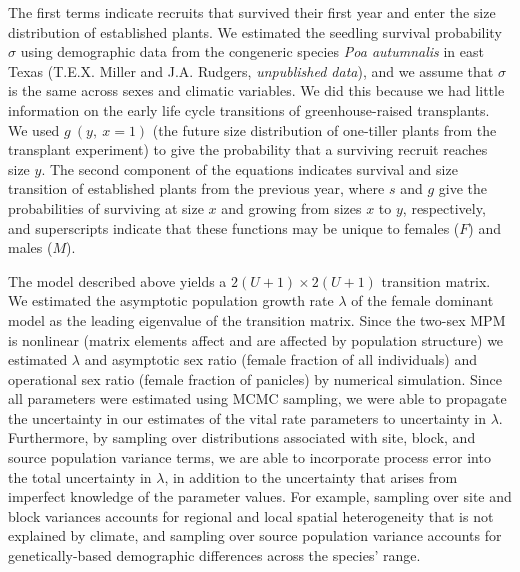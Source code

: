 \documentclass[9pt,twocolumn,twoside,lineno]{pnas-new}
\newcommand{\revise}[1]{{\color{Mahogany}{#1}}}
\begin{document}
\noindent The first terms indicate recruits that survived their first year and enter the size distribution of established plants.
We estimated the seedling survival probability $\sigma$ using demographic data from the congeneric species \textit{Poa autumnalis} in east Texas (T.E.X. Miller and J.A. Rudgers, \textit{unpublished data}), and we assume that $\sigma$ is the same across sexes and climatic variables. 
We did this because we had little information on the early life cycle transitions of greenhouse-raised transplants.
We used $g\ (y,\ x=1)$ (the future size distribution of one-tiller plants from the transplant experiment) to give the probability that a surviving recruit reaches size $y$.
The second component of the equations indicates survival and size transition of established plants from the previous year, where $s$ and $g$ give the probabilities of surviving at size $x$ and growing from sizes $x$ to $y$, respectively, and superscripts indicate that these functions may be unique to females ($F$) and males ($M$).

The model described above yields a $2(U+1) \times 2(U+1)$ transition matrix. 
\revise{The matrix population model is parameterized from regression sub-models like an integral projection model (IPM), but it is not an IPM because size is a discrete state variable.
We employed a discrete probability distribution (the Poisson Inverse-Gaussian) to define transitions from each initial size to each possible subsequent size in $[1,...\ U]$ (SI Appendix, section B).}
We estimated the asymptotic population growth rate $\lambda$ of the female dominant model as the leading eigenvalue of the transition matrix. 
Since the two-sex MPM is nonlinear (matrix elements affect and are affected by population structure) we estimated $\lambda$ and asymptotic sex ratio (female fraction of all individuals) and operational sex ratio (female fraction of panicles) by numerical simulation.
Since all parameters were estimated using MCMC sampling, we were able to propagate the uncertainty in our estimates of the vital rate parameters to uncertainty in $\lambda$. 
Furthermore, by sampling over distributions associated with site, block, and source population variance terms, we are able to incorporate process error into the total uncertainty in $\lambda$, in addition to the uncertainty that arises from imperfect knowledge of the parameter values. 
For example, sampling over site and block variances accounts for regional and local spatial heterogeneity that is not explained by climate, and sampling over source population variance accounts for genetically-based demographic differences across the species' range.
\end{document}
